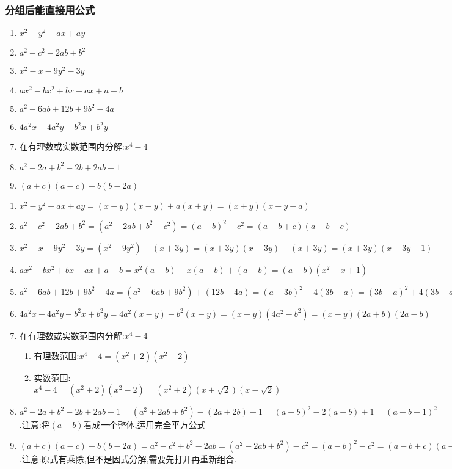 \documentclass[cn,blue]{elegantbook}
\begin{document}
\subsubsection{分组后能直接用公式}%
\label{par:分组后能直接用公式}
\begin{problem}
    \begin{enumerate}
        \item \(x^2 -y^2+ax+ay\)
        \item \(a^2 -c^2-2ab+b^2\)
        \item \(x^2-x-9y^2-3y\)
        \item \(ax^2 -bx^2+bx-ax+a-b\)
        \item \(a^2 -6ab+12b+9b^2-4a\)
        \item \(4a^2x-4a^2y-b^2x+b^2y\)
        \item 在有理数或实数范围内分解:\(x^4-4\)
        \item \(a^2 -2a+b^2-2b+2ab+1\)
        \item \((a+c)(a-c)+b(b-2a)\)
    \end{enumerate}
\end{problem}
\begin{solution}
    \begin{enumerate}
        \item \(x^2 -y^2+ax+ay=(x+y)(x-y)+a(x+y)=(x+y)(x-y+a)\)
        \item \(a^2 -c^2-2ab+b^2=(a^2-2ab+b^2-c^2)=(a-b)^2-c^2=(a-b+c)(a-b-c)\)
        \item \(x^2-x-9y^2-3y=(x^2-9y^2)-(x+3y)=(x+3y)(x-3y)-(x+3y)=(x+3y)(x-3y-1)\)
        \item \(ax^2 -bx^2+bx-ax+a-b=x^2(a-b)-x(a-b)+(a-b)=(a-b)(x^2-x+1)\)
        \item \(a^2 -6ab+12b+9b^2-4a=(a^2-6ab+9b^2)+(12b-4a)=(a-3b)^2+4(3b-a)=(3b-a)^2+4(3b-a)=(3b-a)(3b-a+4)\)
        \item \(4a^2x-4a^2y-b^2x+b^2y=4a^2(x-y)-b^2(x-y)=(x-y)(4a^2-b^2)=(x-y)(2a+b)(2a-b)\)
        \item 在有理数或实数范围内分解:\(x^4-4\)
            \begin{enumerate}
                \item 有理数范围:\(x^4-4=(x^2+2)(x^2-2)\)
                \item 实数范围:\(x^4-4=(x^2+2)(x^2-2)=(x^2+2)(x+\sqrt{2})(x-\sqrt{2})\)
            \end{enumerate}
        \item \(a^2 -2a+b^2-2b+2ab+1=(a^2+2ab+b^2)-(2a+2b)+1=(a+b)^2-2(a+b)+1=(a+b-1)^2\).注意:将\((a+b)\)看成一个整体,运用完全平方公式
        \item \((a+c)(a-c)+b(b-2a)=a^2-c^2+b^2-2ab=(a^2-2ab+b^2)-c^2=(a-b)^2-c^2=(a-b+c)(a-b-c)\).注意:原式有乘除,但不是因式分解,需要先打开再重新组合.
    \end{enumerate}
\end{solution}
\end{document}
